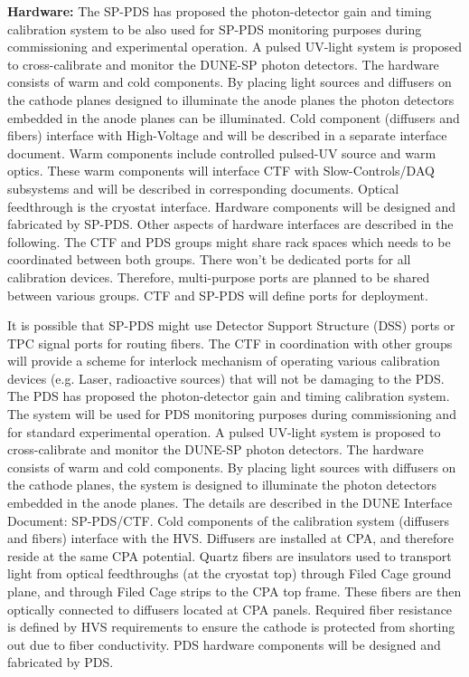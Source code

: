 \textbf{Hardware:} The SP-PDS has proposed the photon-detector gain and timing calibration system to be also used for SP-PDS monitoring purposes during commissioning and experimental operation. A pulsed UV-light system is proposed to cross-calibrate and monitor the DUNE-SP photon detectors. The hardware consists of warm and cold components. By placing light sources and diffusers on the cathode planes designed to illuminate the anode planes the photon detectors embedded in the anode planes can be illuminated. Cold component (diffusers and fibers) interface with High-Voltage and will be described in a separate interface document. Warm components include controlled pulsed-UV source and warm optics. These warm components will interface CTF with Slow-Controls/DAQ subsystems and will be described in corresponding documents. Optical feedthrough is the cryostat interface. Hardware components will be designed and fabricated by SP-PDS. Other aspects of hardware interfaces are described in the following. The CTF and PDS groups might share rack spaces which needs to be coordinated between both groups. There won't be dedicated ports for all calibration devices. Therefore, multi-purpose ports are planned to be shared between various groups. CTF and SP-PDS will define ports for deployment. 

It is possible that SP-PDS might use Detector Support Structure (DSS) ports or TPC signal ports for routing fibers. The CTF in coordination with other groups will provide a scheme for interlock mechanism of operating various calibration devices (e.g. Laser, radioactive sources) that will not be damaging to the PDS. The PDS has proposed the photon-detector gain and timing calibration system. The system will be used for PDS monitoring purposes during commissioning and for standard experimental operation. A pulsed UV-light system is proposed to cross-calibrate and monitor the DUNE-SP photon detectors. The hardware consists of warm and cold components. By placing light sources with diffusers on the cathode planes, the system is designed to illuminate the photon detectors embedded in the anode planes. The details are described in the DUNE Interface Document: SP-PDS/CTF. Cold components of the calibration system (diffusers and fibers) interface with the HVS. Diffusers are installed at CPA, and therefore reside at the same CPA potential. Quartz fibers are insulators used to transport light from optical feedthroughs (at the cryostat top) through Filed Cage ground plane, and through Filed Cage strips to the CPA top frame. These fibers are then optically connected to diffusers located at CPA panels. Required fiber resistance is defined by HVS requirements to ensure the cathode is protected from shorting out due to fiber conductivity. PDS hardware components will be designed and fabricated by PDS.

